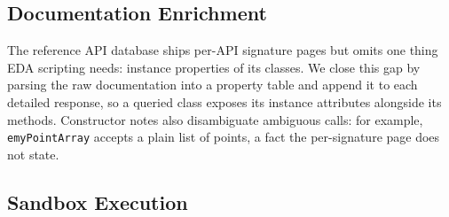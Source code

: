 \documentclass[conference]{IEEEtran}
\begin{document}

\subsection{Documentation Enrichment}
\label{sec:method_doc}

The reference API database ships per-API signature pages but omits one thing EDA scripting needs: instance properties of its classes. We close this gap by parsing the raw documentation into a property table and append it to each detailed response, so a queried class exposes its instance attributes alongside its methods. Constructor notes also disambiguate ambiguous calls: for example, \texttt{emyPointArray} accepts a plain list of points, a fact the per-signature page does not state.

\subsection{Sandbox Execution}
\label{sec:method_sandbox}
\end{document}
